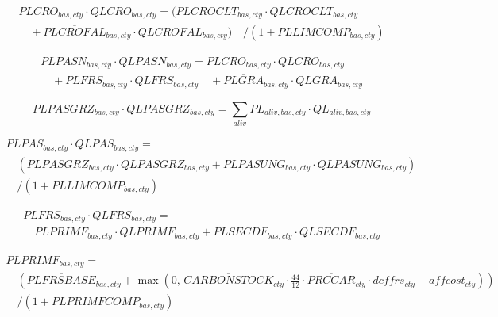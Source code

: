 \begin{multline}
  PLCRO_{bas,cty}\cdot QLCRO_{bas,cty}
  = \bigl(
       PLCROCLT_{bas,cty}\cdot QLCROCLT_{bas,cty}
       \\[-0.3em]
  \quad
       + \overline{PLCROFAL}_{bas,cty}\cdot QLCROFAL_{bas,cty}
     \bigr)
  \quad / (1 + PLLIMCOMP_{bas,cty})
  \tag{PLCROEQ}\label{eq:PLCROEQ}
\end{multline}

\vspace{0.3\baselineskip}

\begin{multline}
  PLPASN_{bas,cty}\cdot QLPASN_{bas,cty}
  = PLCRO_{bas,cty}\cdot QLCRO_{bas,cty}
    \\[-0.3em]
  \quad + PLFRS_{bas,cty}\cdot QLFRS_{bas,cty}
  \quad + \overline{PLGRA}_{bas,cty}\cdot QLGRA_{bas,cty}
  \tag{PLPASNEQ}\label{eq:PLPASNEQ}
\end{multline}

\vspace{0.3\baselineskip}

\begin{equation}
  PLPASGRZ_{bas,cty}\cdot QLPASGRZ_{bas,cty}
  = \sum_{aliv} PL_{aliv,bas,cty}\cdot QL_{aliv,bas,cty}
  \tag{PLPASGRZEQ}\label{eq:PLPASGRZEQ}
\end{equation}

\vspace{0.3\baselineskip}

\begin{multline}
  PLPAS_{bas,cty}\cdot QLPAS_{bas,cty}
  =
  \\[-0.3em]
  \quad 
  \left(
    PLPASGRZ_{bas,cty}\cdot QLPASGRZ_{bas,cty}
    +
    PLPASUNG_{bas,cty}\cdot QLPASUNG_{bas,cty}
  \right)
  \\[-0.3em]
  \quad / (1 + PLLIMCOMP_{bas,cty})
  \tag{PLPASEQ}\label{eq:PLPASEQ}
\end{multline}

\vspace{0.3\baselineskip}

\begin{multline}
  PLFRS_{bas,cty}\cdot QLFRS_{bas,cty}
  =
  \\[-0.3em]
  \quad 
  PLPRIMF_{bas,cty}\cdot QLPRIMF_{bas,cty}
  +
  PLSECDF_{bas,cty}\cdot QLSECDF_{bas,cty}
  \tag{PLFRSEQ}\label{eq:PLFRSEQ}
\end{multline}

\begin{multline}
  PLPRIMF_{bas,cty}
  =
  \\[-0.3em]
  \quad 
  \left(
    \overline{PLFRSBASE}_{bas,cty}
    + \max\!\left(
        0,\,
        \overline{CARBONSTOCK}_{cty}
        \cdot \frac{44}{12}
        \cdot \overline{PRCCAR}_{cty}
        \cdot dcffrs_{cty}
        - affcost_{cty}
      \right)
  \right)
  \\[-0.3em]
  \quad / (1 + PLPRIMFCOMP_{bas,cty})
  \tag{PLPRIMFEQ}\label{eq:PLPRIMFEQ}
\end{multline}

